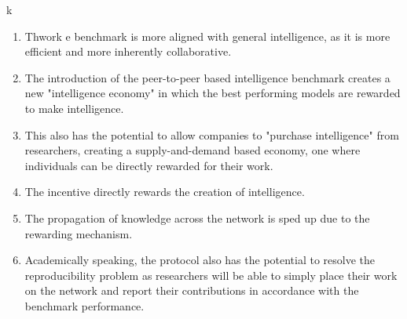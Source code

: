 \documentclass{article}
\begin{document}
k
\begin{enumerate}
    \item Thwork e benchmark is more aligned with general intelligence, as it is more efficient and more inherently collaborative. 
    \item The introduction of the peer-to-peer based intelligence benchmark creates a new "intelligence economy" in which the best performing models are rewarded to make intelligence.
    \item This also has the potential to allow companies to "purchase intelligence" from researchers, creating a supply-and-demand based economy, one where individuals can be directly rewarded for their work.
    \item The incentive directly rewards the creation of intelligence.  
   
    \item The propagation of knowledge across the network is sped up due to the rewarding mechanism. 
    \item Academically speaking, the protocol also has the potential to resolve the reproducibility problem as researchers will be able to simply place their work on the network and report their contributions in accordance with the benchmark performance. 
\end{enumerate}
 
\newpage


\small

\end{document}
